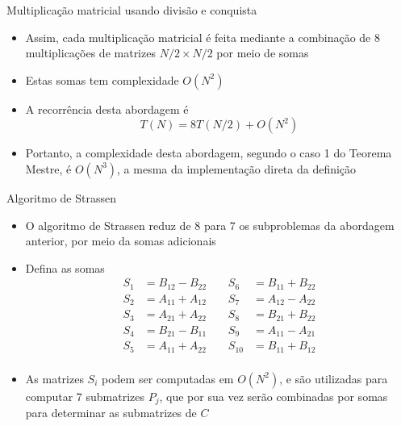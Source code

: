 \begin{frame}[fragile]{Multiplicação matricial usando divisão e conquista}

    \begin{itemize}
        \item Assim, cada multiplicação matricial é feita mediante a combinação de 8 multiplicações
            de matrizes $N/2 \times N/2$ por meio de somas

        \item Estas somas tem complexidade $O(N^2)$

        \item A recorrência desta abordagem é
        \[
            T(N) = 8T(N/2) + O(N^2)
        \]

        \item Portanto, a complexidade desta abordagem, segundo o caso 1 do Teorema Mestre, é
            $O(N^3)$, a mesma da implementação direta da definição

    \end{itemize}

\end{frame}

\begin{frame}[fragile]{Algoritmo de Strassen}

    \begin{itemize}
        \item O algoritmo de Strassen reduz de 8 para 7 os subproblemas da abordagem anterior,
            por meio da somas adicionais

        \item Defina as somas 
        \begin{align*}
            S_1 &= B_{12} - B_{22} & \ \ \ \ \ S_6 &=  B_{11} + B_{22} \\
            S_2 &= A_{11} + A_{12} & \ \ \ \ \ S_7 &=  A_{12} - A_{22} \\
            S_3 &= A_{21} + A_{22} & \ \ \ \ \ S_8 &=  B_{21} + B_{22} \\
            S_4 &= B_{21} - B_{11} & \ \ \ \ \ S_9 &=  A_{11} - A_{21} \\
            S_5 &= A_{11} + A_{22} & \ \ \ \ \ S_{10} &=  B_{11} + B_{12} \\
        \end{align*}

        \item As matrizes $S_i$ podem ser computadas em $O(N^2)$, e são utilizadas para 
            computar 7 submatrizes $P_j$, que por sua vez serão combinadas por somas para 
            determinar as submatrizes de $C$
    \end{itemize}

\end{frame}

